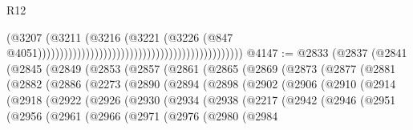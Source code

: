 \begin{lexlean}{R12}
\begin{coremodule}
                                                                                      (@3207
                                                                                        (@3211
                                                                                          (@3216
                                                                                            (@3221
                                                                                              (@3226
                                                                                                (@847
                                                                                                  @4051)))))))))))))))))))))))))))))))))))))))))))))))
@4147 := @2833
    (@2837
      (@2841
        (@2845
          (@2849
            (@2853
              (@2857
                (@2861
                  (@2865
                    (@2869
                      (@2873
                        (@2877
                          (@2881
                            (@2882
                              (@2886
                                (@2273
                                  (@2890
                                    (@2894
                                      (@2898
                                        (@2902
                                          (@2906
                                            (@2910
                                              (@2914
                                                (@2918
                                                  (@2922
                                                    (@2926
                                                      (@2930
                                                        (@2934
                                                          (@2938
                                                            (@2217
                                                              (@2942
                                                                (@2946
                                                                  (@2951
                                                                    (@2956
                                                                      (@2961
                                                                        (@2966
                                                                          (@2971
                                                                            (@2976
                                                                              (@2980
                                                                                (@2984

\end{coremodule}
\end{lexlean}

